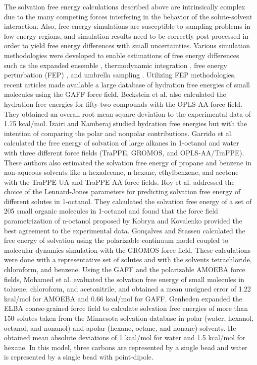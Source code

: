 \documentclass[final,12p,times,twocolumn]{elsarticle}
\begin{document}
	The solvation free energy calculations described above are intrinsically complex due to the many competing forces interfering in the behavior of the solute-solvent interaction. Also, free energy simulations are susceptible to sampling problems in low energy regions, and simulation results need to be correctly post-processed in order to yield free energy differences with small uncertainties. {Various simulation methodologies were developed to enable estimations of free energy differences} such as the expanded ensemble \cite{lyubartsev}, thermodynamic integration \cite{kirkwood1935}, free energy perturbation (FEP) \cite{zwanzig1954,bennet1976,mbar}, and umbrella sampling \cite{TORRIE1977187}.  Utilizing  FEP methodologies, recent articles \cite{PMID:24928188,mobley2017} made available a large database of hydration free energies of small molecules using the GAFF force field. Beckstein et al. \cite{Beckstein2014} also calculated the hydration free energies for fifty-two compounds with the OPLS-AA force field. They obtained an overall root mean square deviation to the experimental data of 1.75 kcal/mol. Izairi and Kamberaj \cite{izairi2017} studied hydration free energies but with the intention of comparing the polar and nonpolar contributions. Garrido et al. \cite{garrido,garrido2011} calculated the free energy of solvation of large alkanes in 1-octanol and water with three different force fields (TraPPE, GROMOS, and OPLS-AA/TraPPE). These authors also estimated the solvation free energy of propane and benzene in non-aqueous solvents like n-hexadecane, n-hexane, ethylbenzene, and acetone with the TraPPE-UA and TraPPE-AA force fields. Roy et al. \cite{roy2017}  addressed the choice of the Lennard-Jones parameters for predicting solvation free energy of different solutes in 1-octanol. They calculated the solvation free energy of a set of 205 small organic molecules in 1-octanol and found that the force field parametrization of n-octanol proposed by  Kobryn and Kovalenko \cite{doi:10.1063/1.2972978} provided the best agreement to the experimental data. Gon\c{c}alves and
	Stassen  \cite{goncalves} calculated the free energy of solvation using the polarizable continuum model coupled to molecular dynamics simulation with the GROMOS force field. These calculations were done with a representative set of solutes and with the solvents tetrachloride, chloroform, and benzene. Using the GAFF and the polarizable AMOEBA force fields, Mohamed et al.  \cite{mohamed2016} evaluated the solvation free energy of small molecules in toluene, chloroform, and acetonitrile, and obtained a mean unsigned error of 1.22 kcal/mol for AMOEBA and 0.66 kcal/mol for GAFF. Genheden \cite{doi:10.1021/acs.jctc.5b00963} expanded the ELBA coarse-grained force field to calculate solvation free energies of more than 150 solutes taken from the Minnesota solvation database in polar (water, hexanol, octanol, and nonanol) and apolar (hexane, octane, and nonane) solvents. He obtained mean absolute deviations of 1 kcal/mol for water and 1.5 kcal/mol for hexane. In this model, three carbons are represented by a single bead and water is represented by a single bead with point-dipole.     
	
\end{document}
